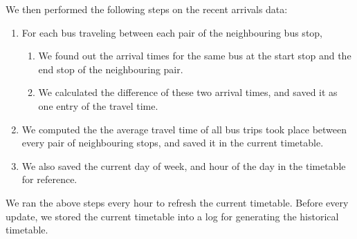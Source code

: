 \par We then performed the following steps on the recent arrivals data:

\begin{enumerate}
  \item For each bus traveling between each pair of the neighbouring bus stop,
  \begin{enumerate}
    \item We found out the arrival times for the same bus at the start stop and the end stop of the neighbouring pair.
    \item We calculated the difference of these two arrival times, and saved it as one entry of the travel time.
  \end{enumerate}
  \item We computed the the average travel time of all bus trips took place between every pair of neighbouring stops, and saved it in the current timetable.
  \item We also saved the current day of week, and hour of the day in the timetable for reference.
\end {enumerate}

\par We ran the above steps every hour to refresh the current timetable. Before every update, we stored the current timetable into a log for generating the historical timetable.






